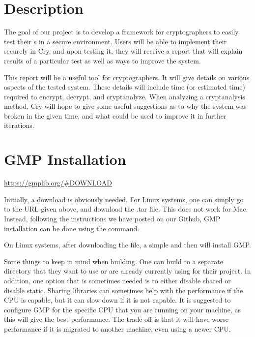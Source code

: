 \section{\cry{} Description}


The goal of our project is to develop a framework for
cryptographers to easily test their \cs s in a
secure environment. Users will be able to implement their
\cs{} securely in Cry, and upon testing it, they will
receive a report that will explain results of a particular
test as well as ways to improve the system.

\medskip

This report will be a useful tool for cryptographers. It
will give details on various aspects of the tested system.
These details will include time (or estimated time) required
to encrypt, decrypt, and cryptanalyze. When analyzing a
cryptanalysis method, Cry will hope to give some useful
suggestions as to why the system was broken in the given
time, and what could be used to improve it in further
iterations.


\section{GMP Installation}

\url{https://gmplib.org/#DOWNLOAD}

\medskip

Initially, a download is obviously needed. For Linux
systems, one can simply go to the URL given above, and
download the .tar file. This does not work for Mac. Instead,
following the instructions we have posted on our Github, GMP
installation can be done using the 
command.

\medskip

On Linux systems, after downloading the file, a simple
 and then  will install
GMP.

\medskip

Some things to keep in mind when building. One can build to
a separate directory that they want to use or are already
currently using for their project. In addition, one option
that is sometimes needed is to either disable shared or
disable static. Sharing libraries can sometimes help with
the performance if the CPU is capable, but it can slow down
if it is not capable. It is suggested to configure GMP for
the specific CPU that you are running on your machine, as
this will give the best performance. The trade off is that
it will have worse performance if it is migrated to another
machine, even using a newer CPU.

